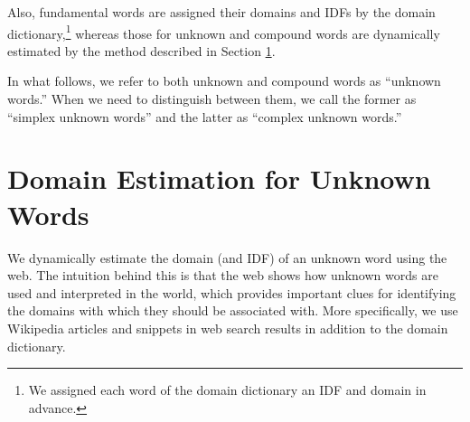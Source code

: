 \documentclass[english]{jnlp_1.4_rep}
\begin{document}
Also, fundamental words are assigned their domains and
IDFs by the domain dictionary,\footnote{
We assigned each word of the
domain dictionary an IDF and domain in advance.} 
whereas those for unknown and compound
words are dynamically estimated  by the method
described in Section \ref{sec:domain-estimation-of-unknown-words}.

In what follows, we refer to both unknown and compound words as
``unknown words.'' 
When we need to distinguish between them, we call the former as
``simplex unknown words'' and the latter as ``complex unknown words.''


\section{Domain Estimation for Unknown Words}
\label{sec:domain-estimation-of-unknown-words}

We dynamically estimate the domain (and IDF)
of an unknown word using the web.
The intuition behind this is that the web shows how unknown words are
used and interpreted in the world, which provides important clues for
identifying the domains with which they should be associated with.
More specifically, we use Wikipedia articles and snippets in web
search results in addition to the domain dictionary.
\end{document}
